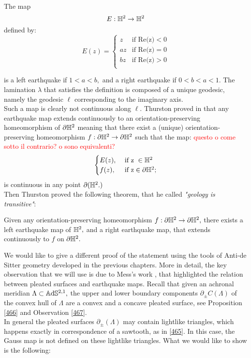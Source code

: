 \begin{example}\label{simplequake}
The map 
\[
    E:\mathbb{H}^2\to\mathbb{H}^2
\]
defined by:
\[
  E(z)= \begin{cases}
    z & \text{if Re(z)}<0 \\
    az & \text{if Re(z)}=0 \\
    bz & \text{if Re(z)}>0 \\    
\end{cases}
\]

is a left earthquake if $1<a<b,$ and a right earthquake if $0<b<a<1$. The lamination $\lambda$ that satisfies the definition is composed of a unique geodesic, namely the geodesic $\ell$ corresponding to the imaginary axis. \\
Such a map is clearly not continuous along $\ell$.
Thurston proved in \cite{thurston1986earthquakes} that any earthquake map extends continuously to an orientation-preserving homeomorphism of $\partial\mathbb{H}^2$ meaning that there exist a (unique) orientation-preserving homeomorphism $f:\partial\mathbb{H}^2\to\partial\mathbb{H}^2$ such that the map: \textcolor{red}{questo o come sotto il contrario? o sono equivalenti?}
\[
    \begin{cases}
        E(z), &\text{ if z }\in \mathbb{H}^2\\
        f(z), &\text{ if z}\in \partial\mathbb{H}^2  ;\\
        
    \end{cases}
\]
is continuous in any point $\partial(\mathbb{H}^2.)$\\
Then Thurston proved the following theorem, that he called \textit{"geology is transitive"}:

\begin{theorem}
    Given any orientation-preserving homeomorphism $f:\partial\mathbb{H}^2\to\partial\mathbb{H}^2,$ there exists a left earthquake map of $\mathbb{H}^2,$ and a right earthquake map, that extends continuously to $f$ on $\partial\mathbb{H}^2.$
\end{theorem}
\end{example}

We would like to give a different proof of the statement using the tools of Anti-de Sitter geometry developed in the previous chapters. More in detail, the key observation that we will use is due to Mess's work \cite{Mess}, that highlighted the relation between pleated surfaces and earthquake maps. Recall that given an achronal meridian $\Lambda\subset\mathbb{A}\mathrm{d}\mathbb{S}^{2,1},$ the upper and lower boundary components $\partial_{\pm}C(\Lambda)$ of the convex hull of $\Lambda$ are a convex and a concave pleated surface, see Proposition \ref{466} and Observation \ref{467}.\\
In general the pleated surfaces $\partial_\pm(\Lambda)$ may contain lightlike triangles, which happens exactly in correspondence of a sawtooth, as in \ref{465}. In this case, the Gauss map is not defined on these lightlike triangles. What we would like to show is the following: 

